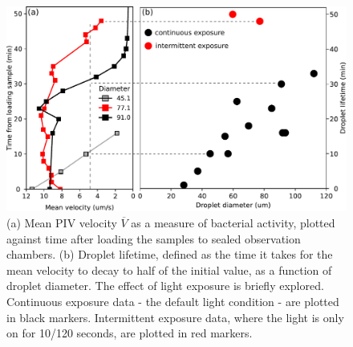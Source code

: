 \documentclass[%
10pt,
superscriptaddress,
twocolumn,
 amsmath,amssymb,
 aps,prx,
]{revtex4-2}
\begin{document}
\begin{figure}[!t]
  \includegraphics[width=\columnwidth]{droplet-lifetime}
  \caption{
  (a) Mean PIV velocity $\overline V$ as a measure of bacterial activity, plotted against time after loading the samples to sealed observation chambers.
  (b) Droplet lifetime, defined as the time it takes for the mean velocity to decay to half of the initial value, as a function of droplet diameter. 
  The effect of light exposure is briefly explored. 
  Continuous exposure data - the default light condition - are plotted in black markers.
  Intermittent exposure data, where the light is only on for 10/120 seconds, are plotted in red markers.
  }
  \label{fig:lifetime}
\end{figure}


\end{document}
